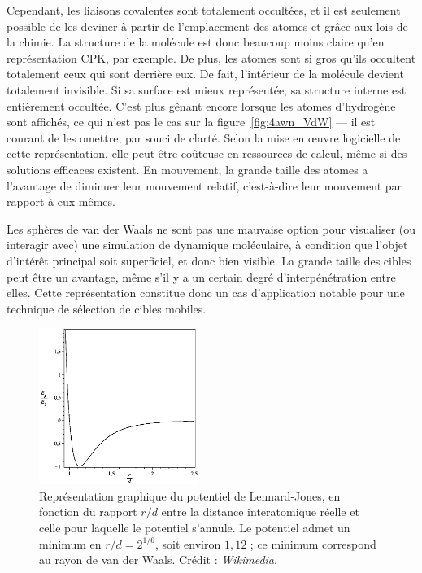 \begin{appendices}
		
	Cependant, les liaisons covalentes sont totalement occultées, et il est seulement possible de les \og deviner \fg{} à partir de l'emplacement des atomes et grâce aux lois de la chimie. La structure de la molécule est donc beaucoup moins claire qu'en représentation CPK, par exemple. De plus, les atomes sont si gros qu'ils occultent totalement ceux qui sont derrière eux. De fait, l'intérieur de la molécule devient totalement invisible. Si sa surface est mieux représentée, sa structure interne est entièrement occultée. C'est plus gênant encore lorsque les atomes d'hydrogène sont affichés, ce qui n'est pas le cas sur la figure~\ref{fig:4awn_VdW} --- il est courant de les omettre, par souci de clarté. Selon la mise en \oe{}uvre logicielle de cette représentation, elle peut être coûteuse en ressources de calcul, même si des solutions efficaces existent. En mouvement, la grande taille des atomes a l'avantage de diminuer leur mouvement relatif, c'est-à-dire leur mouvement par rapport à eux-mêmes.
		
	Les sphères de van der Waals ne sont pas une mauvaise option pour visualiser (ou interagir avec) une simulation de dynamique moléculaire, à condition que l'objet d'intérêt principal soit superficiel, et donc bien visible. La grande taille des cibles peut être un avantage, même s'il y a un certain degré d'interpénétration entre elles. Cette représentation constitue donc un cas d'application notable pour une technique de sélection de cibles mobiles.
	
 	\begin{figure}[!htbp]
 		\centering
 		\includegraphics[width=0.46\textwidth]{figures/ch1/lennard-jones}
		\caption[Représentation graphique du potentiel de Lennard-Jones]{Représentation graphique du potentiel de Lennard-Jones, en fonction du rapport $r/d$ entre la distance interatomique réelle et celle pour laquelle le potentiel s'annule. Le potentiel admet un minimum en $r/d = 2^{1/6}$, soit environ $1,12$ ; ce minimum correspond au rayon de van der Waals. Crédit : \emph{Wikimedia}.}
 		\label{fig:lennard}
 	\end{figure}
	

\end{appendices}
